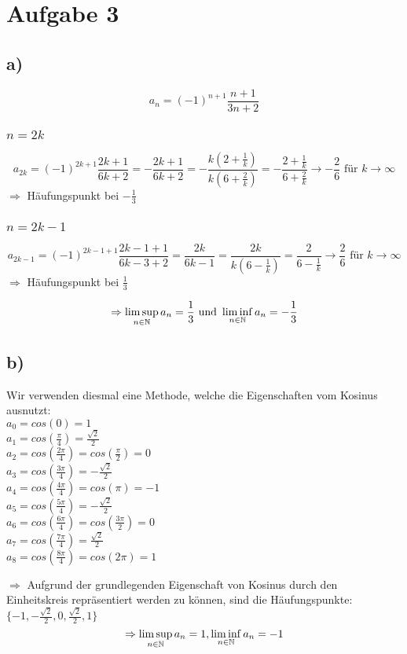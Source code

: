 \section{Aufgabe 3}
    \subsection{a)}
        $$a_n=(-1)^{n+1}\frac{n+1}{3n+2}$$
        \subsubsection{$n=2k$}
            $$a_{2k}=(-1)^{2k+1}\frac{2k+1}{6k+2}=-\frac{2k+1}{6k+2}=-\frac{k(2+\frac{1}{k})}{k(6+\frac{2}{k})}=-\frac{2+\frac{1}{k}}{6+\frac{2}{k}}\to -\frac{2}{6} \text{ für } k \to \infty$$
            $\Rightarrow$ Häufungspunkt bei $-\frac{1}{3}$

        \subsubsection{$n=2k-1$}
             $$a_{2k-1}=(-1)^{2k-1+1}\frac{2k-1+1}{6k-3+2}=\frac{2k}{6k-1}=\frac{2k}{k(6-\frac{1}{k})}=\frac{2}{6-\frac{1}{k}}\to \frac{2}{6} \text{ für } k \to \infty$$
             $\Rightarrow$ Häufungspunkt bei $\frac{1}{3}$

         $$\Rightarrow \limsup_{n \in \mathbb{N}}a_n=\frac{1}{3} \text{ und } \liminf_{n\in\mathbb{N}}a_n = -\frac{1}{3}$$

     \subsection{b)}
        Wir verwenden diesmal eine  Methode, welche die Eigenschaften vom Kosinus ausnutzt: \\
        $a_0 = cos(0) = 1$\\
        $a_1 = cos(\frac{\pi}{4})=\frac{\sqrt{2}}{2}$ \\
        $a_2 = cos(\frac{2\pi}{4})=cos(\frac{\pi}{2})=0$ \\
        $a_3 = cos(\frac{3\pi}{4})=-\frac{\sqrt{2}}{2}$ \\
        $a_4 = cos(\frac{4\pi}{4})=cos(\pi) = -1$ \\
        $a_5 = cos(\frac{5\pi}{4})=-\frac{\sqrt{2}}{2}$ \\
        $a_6 = cos(\frac{6\pi}{4})=cos(\frac{3\pi}{2})=0$ \\
        $a_7 = cos(\frac{7\pi}{4})=\frac{\sqrt{2}}{2}$ \\
        $a_8 = cos(\frac{8\pi}{4})=cos(2\pi)=1$

        $\Rightarrow$ Aufgrund der grundlegenden Eigenschaft von Kosinus durch den Einheitskreis repräsentiert werden zu können, sind die Häufungspunkte: $\{-1, -\frac{\sqrt{2}}{2},0,\frac{\sqrt{2}}{2},1\}$
        $$\Rightarrow \limsup_{n\in\mathbb{N}}a_n=1, \liminf_{n\in\mathbb{N}}a_n=-1$$
